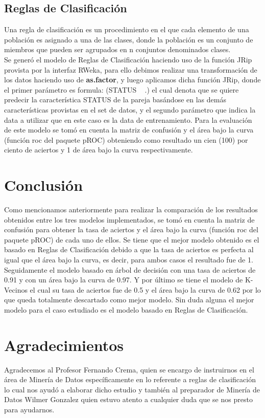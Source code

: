 \documentclass{sciposter}
\begin{document}
\begin{multicols}{3}
\subsection{Reglas de Clasificación}
Una regla de clasificación\cite{ClassRules} es un procedimiento en el que cada elemento de una población es asignado a una de las clases, donde la población es un conjunto de miembros que pueden ser agrupados en n conjuntos denominados clases.\\
Se generó el modelo de Reglas de Clasificación haciendo uso de la función JRip provista por la interfaz RWeka, para ello debimos realizar una transformación de los datos haciendo uso de \textbf{as.factor}, y luego aplicamos dicha función JRip, donde el primer parámetro es formula: (STATUS ~ .)  el cual denota que se quiere predecir la característica STATUS de la pareja basándose en las demás características provistas en el set de datos, y el segundo parámetro que indica la data a utilizar que en este caso es la data de entrenamiento.  Para la evaluación de este modelo se tomó en cuenta la matriz de confusión y el área bajo la curva (función roc del paquete pROC) obteniendo como resultado un cien (100) por ciento de aciertos y 1 de área bajo la curva respectivamente. 
\\

\section{Conclusión}
Como mencionamos anteriormente para realizar la comparación de los resultados obtenidos entre los tres modelos implementados, se tomó en cuenta la matriz de confusión para obtener la tasa de aciertos y el área bajo la curva (función roc del paquete pROC) de cada uno de ellos. Se tiene que el mejor modelo obtenido es el basado en Reglas de Clasificación debido a que la tasa de aciertos es perfecta al igual que el área bajo la curva, es decir, para ambos casos el resultado fue de 1. Seguidamente el modelo basado en árbol de decisión con una tasa de aciertos de 0.91 y con un área bajo la curva de 0.97. Y por último se tiene el modelo de K-Vecinos el cual su tasa de aciertos fue de 0.5 y el área bajo la curva de 0.62 por lo que queda totalmente descartado como mejor modelo. Sin duda alguna el mejor modelo para el caso estudiado es el modelo basado en Reglas de Clasificación.
\\

\section{Agradecimientos}
Agradecemos al Profesor Fernando Crema, quien se encargo de instruirnos en el área de Minería de Datos específicamente en lo referente a reglas de clasificación lo cual nos ayudó a elaborar dicho estudio y también al preparador de Minería de Datos Wilmer Gonzalez quien estuvo atento a cualquier duda que se nos presto para ayudarnos.
\\    


\end{multicols}
\end{document}
